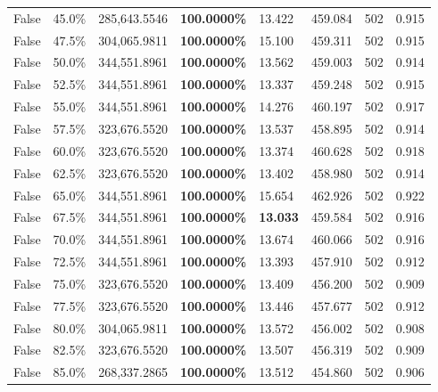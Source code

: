 \begin{table}[H]
{\begin{tabular}{lllrllll}
\cline{1-8}
False & 45.0\% & 285,643.5546 & \bfseries \color{red} 100.0000\% & 13.422 & 459.084 & 502 & 0.915 \\
\cline{1-8}
False & 47.5\% & 304,065.9811 & \bfseries \color{red} 100.0000\% & 15.100 & 459.311 & 502 & 0.915 \\
\cline{1-8}
False & 50.0\% & 344,551.8961 & \bfseries \color{red} 100.0000\% & 13.562 & 459.003 & 502 & 0.914 \\
\cline{1-8}
False & 52.5\% & 344,551.8961 & \bfseries \color{red} 100.0000\% & 13.337 & 459.248 & 502 & 0.915 \\
\cline{1-8}
False & 55.0\% & 344,551.8961 & \bfseries \color{red} 100.0000\% & 14.276 & 460.197 & 502 & 0.917 \\
\cline{1-8}
False & 57.5\% & 323,676.5520 & \bfseries \color{red} 100.0000\% & 13.537 & 458.895 & 502 & 0.914 \\
\cline{1-8}
False & 60.0\% & 323,676.5520 & \bfseries \color{red} 100.0000\% & 13.374 & 460.628 & 502 & 0.918 \\
\cline{1-8}
False & 62.5\% & 323,676.5520 & \bfseries \color{red} 100.0000\% & 13.402 & 458.980 & 502 & 0.914 \\
\cline{1-8}
False & 65.0\% & 344,551.8961 & \bfseries \color{red} 100.0000\% & 15.654 & 462.926 & 502 & 0.922 \\
\cline{1-8}
False & 67.5\% & 344,551.8961 & \bfseries \color{red} 100.0000\% & \bfseries \color{red} 13.033 & 459.584 & 502 & 0.916 \\
\cline{1-8}
False & 70.0\% & 344,551.8961 & \bfseries \color{red} 100.0000\% & 13.674 & 460.066 & 502 & 0.916 \\
\cline{1-8}
False & 72.5\% & 344,551.8961 & \bfseries \color{red} 100.0000\% & 13.393 & 457.910 & 502 & 0.912 \\
\cline{1-8}
False & 75.0\% & 323,676.5520 & \bfseries \color{red} 100.0000\% & 13.409 & 456.200 & 502 & 0.909 \\
\cline{1-8}
False & 77.5\% & 323,676.5520 & \bfseries \color{red} 100.0000\% & 13.446 & 457.677 & 502 & 0.912 \\
\cline{1-8}
False & 80.0\% & 304,065.9811 & \bfseries \color{red} 100.0000\% & 13.572 & 456.002 & 502 & 0.908 \\
\cline{1-8}
False & 82.5\% & 323,676.5520 & \bfseries \color{red} 100.0000\% & 13.507 & 456.319 & 502 & 0.909 \\
\cline{1-8}
False & 85.0\% & 268,337.2865 & \bfseries \color{red} 100.0000\% & 13.512 & 454.860 & 502 & 0.906 \\

\end{tabular}}
\end{table}
